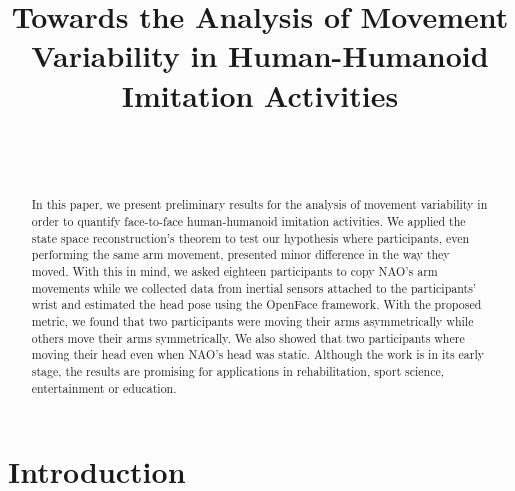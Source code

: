 \documentclass{sigchi}
\def\plaintitle{Towards the Analysis of Movement Variability in Human-Humanoid
Imitation Activities}
\def\plainkeywords{Authors' choice; of terms; separated; by
  semicolons; include commas, within terms only; required.}
\begin{document}
\title{\plaintitle}

\author{%
  \\
  \\
}

\maketitle


\begin{abstract}
  In this paper, we present preliminary results for the analysis of movement
  variability in order to quantify face-to-face human-humanoid imitation activities.
  We applied the state space reconstruction's theorem to test our
  hypothesis where participants, even performing the same arm movement,
  presented minor difference in the way they moved.
  With this in mind, we asked eighteen participants to copy NAO's arm
  movements while we collected data from inertial sensors attached to the
  participants' wrist and estimated the head pose using the OpenFace framework.
  With the proposed metric, we found that two participants were moving their arms
  asymmetrically while others move their arms symmetrically.
  We also showed that two participants where moving
  their head even when NAO's head was static.
  Although the work is in its early stage, the results are promising for
  applications in rehabilitation, sport science, entertainment or education.
\end{abstract}




\section{Introduction}
\end{document}

